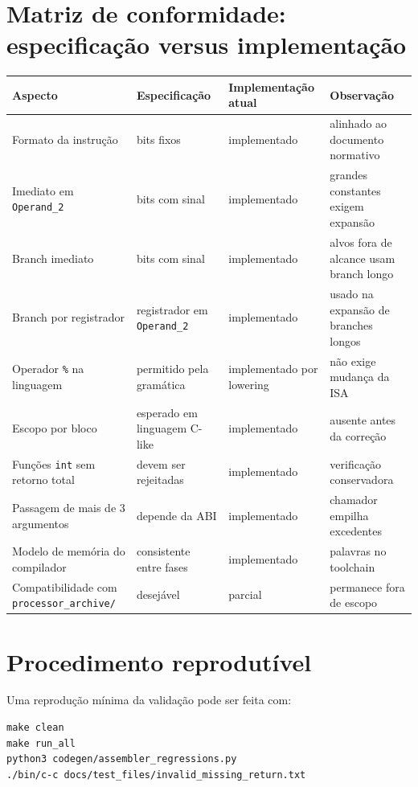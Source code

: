 \documentclass[12pt,a4paper]{article}
\begin{document}
\appendix

\section{Matriz de conformidade: especificação versus implementação}
\begin{longtable}{>{\raggedright\arraybackslash}p{} >{\raggedright\arraybackslash}p{} >{\raggedright\arraybackslash}p{} >{\raggedright\arraybackslash}p{}}
\toprule
\textbf{Aspecto} & \textbf{Especificação} & \textbf{Implementação atual} & \textbf{Observação} \\
\midrule
\endhead
Formato da instrução & 32 bits fixos & implementado & alinhado ao documento normativo \\
Imediato em \texttt{Operand\_2} & 10 bits com sinal & implementado & grandes constantes exigem expansão \\
Branch imediato & 10 bits com sinal & implementado & alvos fora de alcance usam branch longo \\
Branch por registrador & registrador em \texttt{Operand\_2} & implementado & usado na expansão de branches longos \\
Operador \texttt{\%} na linguagem & permitido pela gramática & implementado por lowering & não exige mudança da ISA \\
Escopo por bloco & esperado em linguagem C-like & implementado & ausente antes da correção \\
Funções \texttt{int} sem retorno total & devem ser rejeitadas & implementado & verificação conservadora \\
Passagem de mais de 3 argumentos & depende da ABI & implementado & chamador empilha excedentes \\
Modelo de memória do compilador & consistente entre fases & implementado & 256 palavras no toolchain \\
Compatibilidade com \texttt{processor\_archive/} & desejável & parcial & permanece fora de escopo \\
\bottomrule
\end{longtable}

\section{Procedimento reprodutível}
Uma reprodução mínima da validação pode ser feita com:
\begin{verbatim}
make clean
make run_all
python3 codegen/assembler_regressions.py
./bin/c-c docs/test_files/invalid_missing_return.txt
\end{verbatim}
\end{document}
